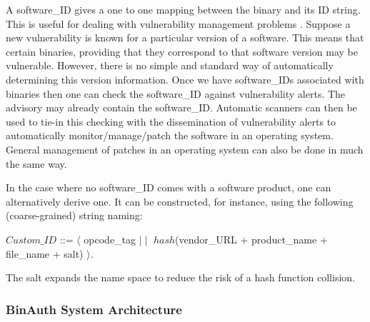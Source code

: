 
A software\_ID gives a one to one mapping between the binary and its ID string.
This is useful for dealing with vulnerability management problems
\cite{sufatrio2004amo}.
Suppose a new vulnerability is known for a particular version of a software.
This means that certain binaries, providing that they correspond to that
software version may be vulnerable. However, there is no simple and standard
way of automatically determining this version information.
Once we have software\_IDs associated with binaries then one can check
the software\_ID against vulnerability alerts. The advisory may
already contain the software\_ID. 
Automatic scanners can then be used
to tie-in this checking with the dissemination of vulnerability alerts
to automatically monitor/manage/patch the software in an operating system.
General management of patches in an operating system can also be done
in much the same way.

In the case where no software\_ID comes with a software product,
one can alternatively derive one.
It can be constructed, for instance, using the following (coarse-grained) string naming:
\begin{center}
\small
$Custom\_ID$ ::= $\langle$ opcode\_tag $\mid\mid$
$hash$(vendor\_URL + product\_name + file\_name + salt) $\rangle$.
\end{center}
The salt expands the name space to reduce the risk of a hash function collision.

\subsubsection{BinAuth System Architecture}


